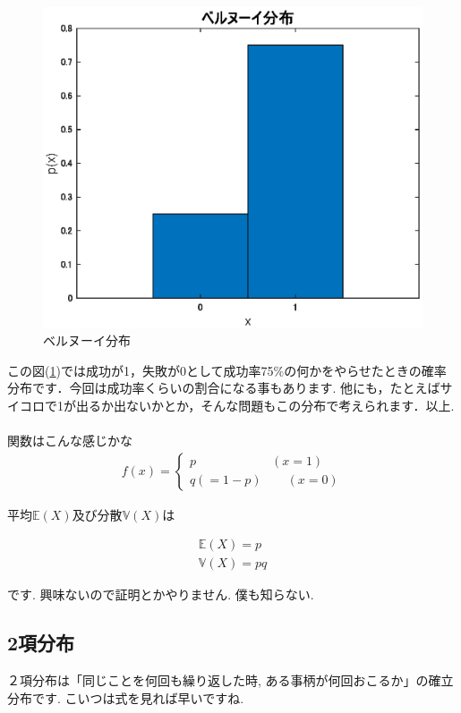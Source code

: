 \documentclass[11pt,a4paper]{ujreport} 	%
\begin{document}
\begin{figure}[H]
\label{im:bernoulli}
  \centering
  \includegraphics[width=15cm]{../figures/bernouli.eps}
  \caption{ベルヌーイ分布}
\end{figure}

この図(\ref{im:bernoulli})では成功が1，失敗が0として成功率75\%の何かをやらせたときの確率分布です．今回は成功率くらいの割合になる事もあります. 他にも，たとえばサイコロで1が出るか出ないかとか，そんな問題もこの分布で考えられます．以上.\\
\\

関数はこんな感じかな
\begin{align}
f(x)=
  \left\{
    \begin{array}{l}
      p \qquad \qquad \qquad (x = 1) \\
      q(=1-p)  \qquad (x=0)
    \end{array}
  \right.
\end{align}

平均$\mathbb{E}(X)$及び分散$\mathbb{V}(X)$は

\begin{align}
\mathbb{E}(X) = p\\
\mathbb{V}(X) = pq
\end{align}

です. 興味ないので証明とかやりません. 僕も知らない.
\subsection{2項分布}
２項分布は「同じことを何回も繰り返した時, ある事柄が何回おこるか」の確立分布です. こいつは式を見れば早いですね.
\end{document}
